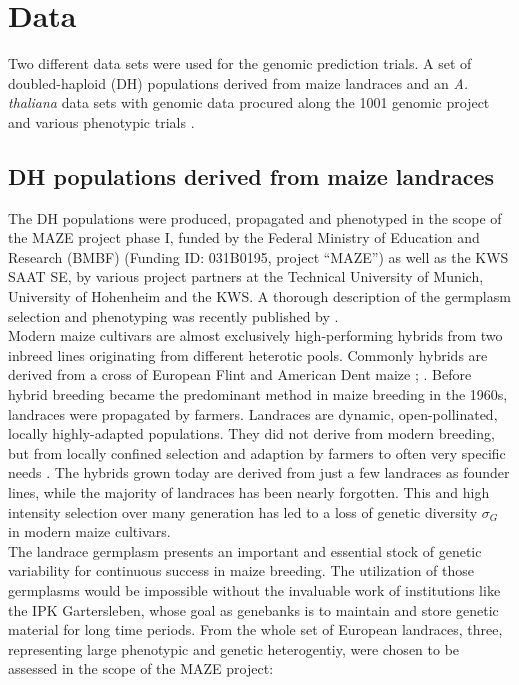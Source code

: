 \section{Data}
Two different data sets were used for the genomic prediction trials. A set of
doubled-haploid (DH) populations derived from maize landraces and an \textit{A. thaliana}
data sets with genomic data procured along the 1001 genomic project \cite{1001genome} and
various phenotypic trials \cite{seren2016arapheno}.


\subsection{DH populations derived from maize landraces}
The DH populations were produced, propagated and phenotyped in the scope of the MAZE
project phase I, funded by the Federal Ministry of Education and Research (BMBF) (Funding
ID: 031B0195, project “MAZE”) as well as the KWS SAAT SE, by various project partners at
the Technical University of Munich, University of Hohenheim and the KWS. A thorough
description of the germplasm selection and phenotyping was recently published by
\cite{holker2019european}. \\
Modern maize cultivars are almost exclusively high-performing hybrids from two inbreed
lines originating from different heterotic pools. Commonly hybrids are derived from a
cross of European Flint and American Dent maize \cite{dos2004priori};
\cite{brauner2019testcross}. Before hybrid breeding became the predominant method in maize
breeding in the 1960s, landraces were propagated by farmers. Landraces are dynamic,
open-pollinated, locally highly-adapted populations. They did not derive from modern
breeding, but from locally confined selection and adaption by farmers to often very
specific needs \cite{arteaga2016genomic}. The hybrids grown today are derived from just a
few landraces as founder lines, while the majority of landraces has been nearly
forgotten. This and high intensity selection over many generation has led to a loss of
genetic diversity $\sigma_G$ in modern maize cultivars.\\
The landrace germplasm presents an important and essential stock of genetic variability
for continuous success in maize breeding. The utilization of those germplasms would be
impossible without the invaluable work of institutions like the IPK Gartersleben, whose
goal as genebanks is to maintain and store genetic material for long time periods. From
the whole set of European landraces, three, representing large phenotypic and
genetic heterogentiy, were chosen to be assessed in the scope of the MAZE project:

